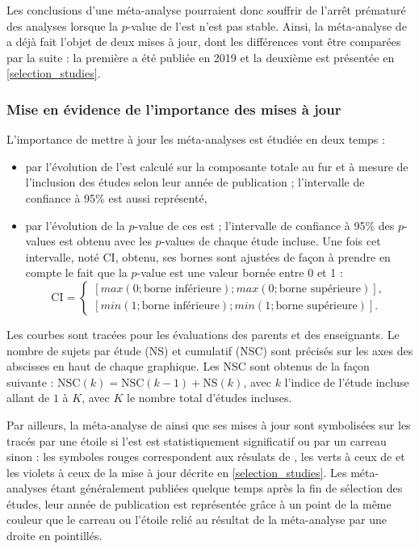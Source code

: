 Les conclusions d'une méta-analyse pourraient donc souffrir de l'arrêt prématuré des analyses lorsque la $p$-value de l'\gls{est} n'est pas stable. 
Ainsi, la méta-analyse de \citet{Cortese2016} a déjà fait l'objet de deux mises à jour, dont les différences vont être comparées par la suite : la première a été publiée 
en 2019 \citep{Bussalb2019clinical} et la deuxième est présentée en \ref{selection_studies}. 

\subsubsection{Mise en évidence de l'importance des mises à jour} \label{methods_importance_to_update_meta_analysis}

L'importance de mettre à jour les méta-analyses est étudiée en deux temps :
\begin{itemize}
\item par l'évolution de l'\gls{est} calculé sur la composante totale au fur et à mesure de l'inclusion des études selon leur année de publication ; l'intervalle de confiance à 95\% est 
aussi représenté,
\item par l'évolution de la $p$-value de ces \gls{est} ; l'intervalle de confiance à 95\% des $p$-values
est obtenu avec les $p$-values de chaque étude incluse. Une fois cet intervalle, noté CI, obtenu, ses bornes sont ajustées de façon à prendre en compte le fait 
que la $p$-value est une valeur bornée entre 0 et 1 \citep{Mandelkern2002} : 
\begin{equation}
\label{eq:metareview_confidence_interval_evolitio_p_value}
\text{CI} = \begin{cases}
           [max(0;\text{borne inférieure}) ; max(0;\text{borne supérieure})], \\
					 [min(1;\text{borne inférieure}) ; min(1;\text{borne supérieure})].
					  \end{cases}
\end{equation}
\end{itemize}
Les courbes sont tracées pour les évaluations des parents et des enseignants. Le nombre de sujets par étude (NS) et cumulatif (NSC) sont précisés sur les axes 
des abscisses en haut de chaque graphique. Les NSC sont obtenus de la façon suivante : $\text{NSC}(k) = \text{NSC}(k - 1) + \text{NS}(k)$, avec $k$ l'indice de l'étude incluse
allant de $1$ à $K$, avec $K$ le nombre total d'études incluses.
 
Par ailleurs, la méta-analyse de \citet{Cortese2016} ainsi que ses mises
à jour sont symbolisées sur les tracés par une étoile si l'\gls{est} est statistiquement significatif ou par un carreau sinon : les symboles
rouges correspondent aux résulats de \citet{Cortese2016}, les verts à ceux de \citet{Bussalb2019clinical} et les violets à ceux de la mise à jour décrite en \ref{selection_studies}. Les méta-analyses
étant généralement publiées quelque temps après la fin de sélection des études, leur année de publication est représentée grâce à un point de la même couleur que le carreau ou
l'étoile relié au résultat de la méta-analyse par une droite en pointillés. 

